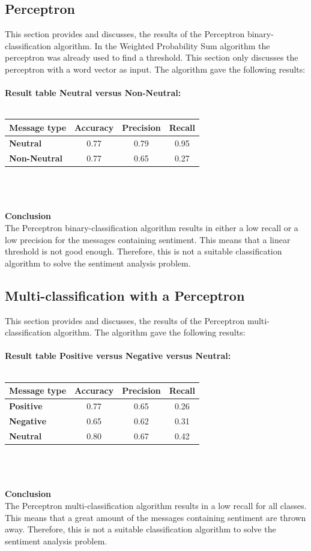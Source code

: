 \documentclass[11pt]{article}
\begin{document}
\subsection{Perceptron}
This section provides and discusses, the results of the Perceptron binary-classification algorithm. In the Weighted Probability Sum algorithm the perceptron was already used to find a threshold. This section only discusses the perceptron with a word vector as input. The algorithm gave the following results:\\\\
\textbf{Result table Neutral versus Non-Neutral:}\\\\
\begin{tabular}{| l || c | c | c |}
\hline
\textbf{Message type} & \textbf{Accuracy} & \textbf{Precision} & \textbf{Recall}\\
\hline \hline
\textbf{Neutral} & 0.77 & 0.79 & 0.95\\
\hline
\textbf{Non-Neutral} & 0.77 & 0.65 & 0.27\\
\hline
\end{tabular}\\\\\\
\textbf{Conclusion}\\
The Perceptron binary-classification algorithm results in either a low recall or a low precision for the messages containing sentiment. This means that a linear threshold is not good enough. Therefore, this is not a suitable classification algorithm to solve the sentiment analysis problem.

\subsection{Multi-classification with a Perceptron}
This section provides and discusses, the results of the Perceptron multi-classification algorithm. The algorithm gave the following results:\\\\
\textbf{Result table Positive versus Negative versus Neutral:}\\\\
\begin{tabular}{| l || c | c | c |}
\hline
\textbf{Message type} & \textbf{Accuracy} & \textbf{Precision} & \textbf{Recall}\\
\hline \hline
\textbf{Positive} & 0.77 & 0.65 & 0.26\\
\hline
\textbf{Negative} & 0.65 & 0.62 & 0.31\\
\hline
\textbf{Neutral}  & 0.80 & 0.67 & 0.42\\
\hline
\end{tabular}\\\\\\
\textbf{Conclusion}\\
The Perceptron multi-classification algorithm results in a low recall for all classes. This means that a great amount of the messages containing sentiment are thrown away. Therefore, this is not a suitable classification algorithm to solve the sentiment analysis problem.
\end{document}

